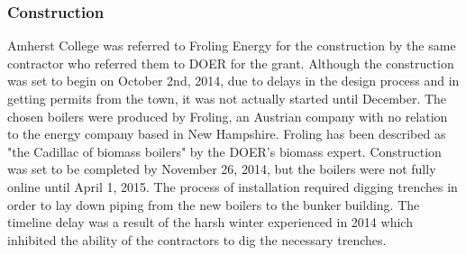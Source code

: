 \subsubsection{Construction}
\par Amherst College was referred to Froling Energy for the construction by the same contractor who referred them to DOER for the grant. Although the construction was set to begin on October 2nd, 2014, due to delays in the design process and in getting permits from the town, it was not actually started until December. The chosen boilers were produced by Froling, an Austrian company with no relation to the energy company based in New Hampshire. Froling has been described as "the Cadillac of biomass boilers" by the DOER’s biomass expert. Construction was set to be completed by November 26, 2014, but the boilers were not fully online until April 1, 2015. The process of installation required digging trenches in order to lay down piping from the new boilers to the bunker building. The timeline delay was a result of the harsh winter experienced in 2014 which inhibited the ability of the contractors to dig the necessary trenches.

